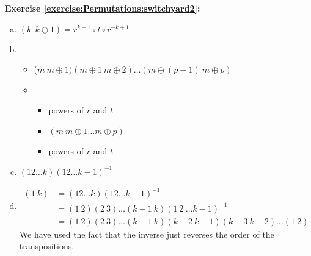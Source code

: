 \noindent\textbf{Exercise \ref{exercise:Permutations:switchyard2}:} %
\begin{enumerate}[(a)]
\item
 $(k~~k\oplus 1)=r^{k-1}\circ t\circ r^{-k+1}$
 
\item
	\begin{itemize}
	\item
	($m\ m\oplus 1)(m\oplus 1\ m\oplus 2)\dots(m\oplus (p-1)\ m\oplus p)$
	
	\item
		\begin{itemize}
		\item
		powers of $r$ and $t$
		
		\item
		$(m\ m\oplus 1\dots m\oplus p)$
		
		\item
		powers of $r$ and $t$
		\end{itemize}
	\end{itemize}

\item
$(12\dots k)(12\dots k-1)^{-1}$

\item
\begin{align*}
(1\ k) &= (12\dots k)(12\dots k-1)^{-1}\\
&= (1\ 2)(2\ 3)\dots(k-1\ k)(1\ 2\ \dots k-1)^{-1}\\ 
&= (1\ 2)(2\ 3)\dots(k-1\ k)(k-2\ k-1) (k - 3\ k-2)\dots(1\ 2) 
\end{align*}
We have used the fact that  the inverse just reverses the order of the transpositions.


\end{enumerate}
